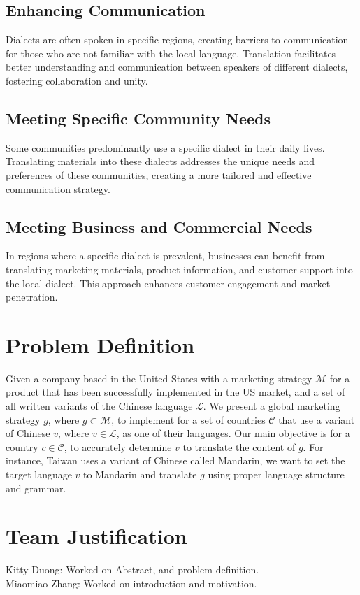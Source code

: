 \documentclass[sigconf]{acmart}
\begin{document}
\subsection{Enhancing Communication}
Dialects are often spoken in specific regions, creating barriers to communication for those who are not familiar with the local language. Translation facilitates better understanding and communication between speakers of different dialects, fostering collaboration and unity.

\subsection{Meeting Specific Community Needs}
Some communities predominantly use a specific dialect in their daily lives. Translating materials into these dialects addresses the unique needs and preferences of these communities, creating a more tailored and effective communication strategy.

\subsection{Meeting Business and Commercial Needs}
In regions where a specific dialect is prevalent, businesses can benefit from translating marketing materials, product information, and customer support into the local dialect. This approach enhances customer engagement and market penetration.

\section{Problem Definition}
Given a company based in the United States with a marketing strategy $\mathcal{M}$ for a product that has been successfully implemented in the US market, and a set of all written variants of the Chinese language $\mathcal{L}$. We present a global marketing strategy $g$, where $g \subset \mathcal{M}$, to implement for a set of countries $\mathcal{C}$ that use a variant of Chinese $v$, where $v \in \mathcal{L}$, as one of their languages. Our main objective is for a country $c \in \mathcal{C}$, to accurately determine $v$ to translate the content of $g$. For instance, Taiwan uses a variant of Chinese called Mandarin, we want to set the target language $v$ to Mandarin and translate $g$ using proper language structure and grammar.

\section{Team Justification}
Kitty Duong: Worked on Abstract, and problem definition.\\
Miaomiao Zhang: Worked on introduction and motivation.
\end{document}
